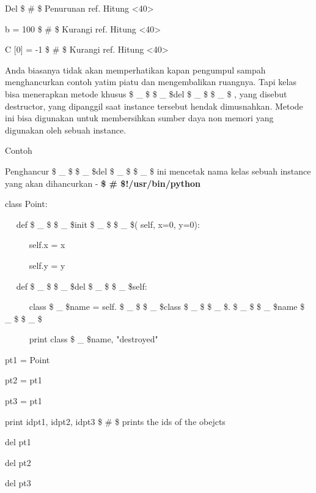 \begin{12pt}
\begin{12pt}
\begin{12pt}
\begin{12pt}
\begin{12pt}
\begin{12pt}
\begin{12pt}
\begin{12pt}
\begin{12pt}
\begin{12pt}
\begin{12pt}
\begin{12pt}
\begin{12pt}
\begin{12pt}
\begin{12pt}
\begin{12pt}
\vspace{12pt}
\noindent 
Del  \$  \#  \$ Penurunan ref. Hitung <40> \par
\noindent 
b = 100  \$  \#  \$ Kurangi ref. Hitung <40> \par
\noindent 
C [0] = -1  \$  \#  \$ Kurangi ref. Hitung <40> \par
\vspace{12pt}
Anda biasanya tidak akan memperhatikan kapan pengumpul sampah menghancurkan contoh yatim piatu dan mengembalikan ruangnya. Tapi kelas bisa menerapkan metode khusus  \$  \_  \$ \$  \_  \$del  \$  \_  \$ \$  \_  \$ {}, yang disebut destructor, yang dipanggil saat instance tersebut hendak dimusnahkan. Metode ini bisa digunakan untuk membersihkan sumber daya non memori yang digunakan oleh sebuah instance. \par
\noindent 
Contoh \par
\vspace{12pt}
\item
Penghancur  \$  \_  \$ \$  \_  \$del  \$  \_  \$ \$  \_  \$ {} ini mencetak nama kelas sebuah instance yang akan dihancurkan - 
\bf
 \$  \#  \$!/usr/bin/python \par
\vspace{12pt}
\noindent 
class Point: \par
\noindent 
~~ def  \$  \_  \$ \$  \_  \$init \$  \_  \$ \$  \_  \$( self, x=0, y=0): \par
\noindent 
~~~~~ self.x = x \par
\noindent 
~~~~~ self.y = y \par
\noindent 
~~ def  \$  \_  \$ \$  \_  \$del \$  \_  \$ \$  \_  \${self}: \par
\noindent 
~~~~~ class \$  \_  \$name = self. \$  \_  \$ \$  \_  \$class \$  \_  \$ \$  \_  \$. \$  \_  \$ \$  \_  \$name \$  \_  \$ \$  \_  \$ \par
\item
~~~~~ print class \$  \_  \$name, "destroyed" \par
\vspace{12pt}
\noindent 
pt1 = Point{} \par
\noindent 
pt2 = pt1 \par
\noindent 
pt3 = pt1 \par
\noindent 
print id{pt1}, id{pt2}, id{pt3}  \$  \#  \$ prints the ids of the obejcts \par
\noindent 
del pt1 \par
\noindent 
del pt2 \par
\noindent 
del pt3 \par

\end{12pt}
\end{12pt}
\end{12pt}
\end{12pt}
\end{12pt}
\end{12pt}
\end{12pt}
\end{12pt}
\end{12pt}
\end{12pt}
\end{12pt}
\end{12pt}
\end{12pt}
\end{12pt}
\end{12pt}
\end{12pt}
